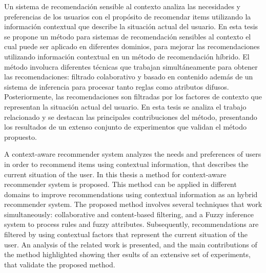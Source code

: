 
Un sistema de recomendaci\'on sensible al contexto analiza  las
necesidades y preferencias de los  usuarios con el prop\'osito de
recomendar items utilizando la informaci\'on contextual que describe
la situaci\'on actual del usuario. En esta tesis se propone un
m\'etodo para sistemas de recomendaci\'on sensibles al contexto el cual 
puede ser aplicado en diferentes dominios, para mejorar las
recomendaciones utilizando informaci\'on contextual en un m\'etodo
de recomendaci\'on h\'ibrido. El m\'etodo involucra diferentes
t\'ecnicas que trabajan simult\'aneamente para obtener las
recomendaciones: filtrado colaborativo y basado en contenido adem\'as
de un sistema de inferencia para procesar tanto reglas como atributos difusos.
Posteriormente, las recomendaciones son filtradas por los factores de
contexto que representan la situaci\'on actual del usuario.
En esta tesis se analiza el trabajo relacionado y se destacan las
principales contribuciones del m\'etodo, presentando los resultados de un
extenso conjunto de experimentos que validan el m\'etodo propuesto.


A context-aware recommender system analyzes the needs and
preferences of users in order to recommend items using contextual
information, that describes the current situation of the user. In this
thesis a method for context-aware recommender system is proposed. This
method can be applied in different domains to improve 
recommendations using contextual information as an hybrid recommender system.
The proposed method involves several techniques that work
simultaneously: collaborative and content-based filtering,
and a Fuzzy inference system to process rules and fuzzy
attributes. Subsequently, recommendations are filtered by using contextual
factors that represent the current situation of the user. An analysis 
of the related work is presented, and the main
contributions of the method highlighted showing ther esults of an 
extensive set of experiments, that validate the proposed method.











